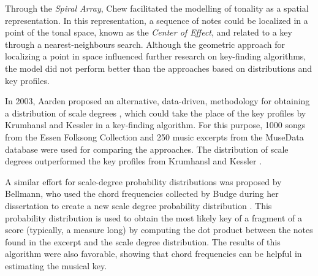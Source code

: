 
Through the \emph{Spiral Array}, Chew \cite{chew2002spiral} facilitated the modelling of tonality as a spatial representation. In this representation, a sequence of notes could be localized in a point of the tonal space, known as the \emph{Center of Effect}, and related to a key through a nearest-neighbours search. Although the geometric approach for localizing a point in space influenced further research on key-finding algorithms, the model did not perform better than the approaches based on distributions and key profiles.


In 2003, Aarden proposed an alternative, data-driven, methodology for obtaining a distribution of scale degrees \cite{aarden2003dynamic}, which could take the place of the key profiles by Krumhansl and Kessler \cite{krumhansl1982tracing} in a key-finding algorithm. For this purpose, 1000 songs from the Essen Folksong Collection and 250 music excerpts from the MuseData database were used for comparing the approaches. The distribution of scale degrees outperformed the key profiles from Krumhansl and Kessler \cite{krumhansl1982tracing}. 





A similar effort for scale-degree probability distributions was proposed by Bellmann, who used the chord frequencies collected by Budge during her dissertation \cite{budge1943study} to create a new scale degree probability distribution \cite{bellmann2006about}. This probability distribution is used to obtain the most likely key of a fragment of a score (typically, a measure long) by computing the dot product between the notes found in the excerpt and the scale degree distribution. The results of this algorithm were also favorable, showing that chord frequencies can be helpful in estimating the musical key.

